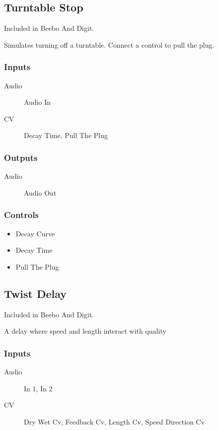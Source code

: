 \subsection{Turntable Stop}

Included in Beebo And Digit.

Simulates turning off a turntable. Connect a control to pull the plug.



\subsubsection{Inputs}
\begin{description}
\item [Audio] Audio In
\item [CV] Decay Time, Pull The Plug
\end{description}

\subsubsection{Outputs}
\begin{description}
\item [Audio] Audio Out
\end{description}

\subsubsection{Controls}
\begin{itemize}
\item Decay Curve
\item Decay Time
\item Pull The Plug
\end{itemize}

\subsection{Twist Delay}

Included in Beebo And Digit.

A delay where speed and length interact with quality



\subsubsection{Inputs}
\begin{description}
\item [Audio] In 1, In 2
\item [CV] Dry Wet Cv, Feedback Cv, Length Cv, Speed Direction Cv
\end{description}

